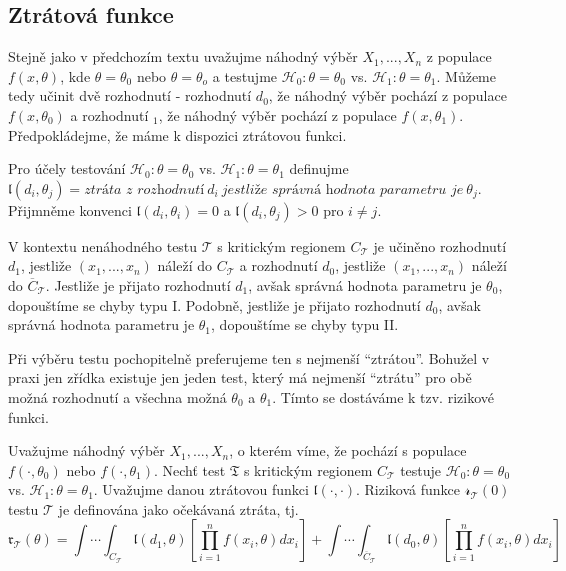 \subsection{Ztrátová funkce}

Stejně jako v předchozím textu uvažujme náhodný výběr $X_1, ..., X_n$ z populace $f(x, \theta)$, kde $\theta = \theta_0$ nebo $\theta = \theta_o$ a testujme $\mathscr{H}_0: \theta = \theta_0$ vs. $\mathscr{H}_1: \theta = \theta_1$. Můžeme tedy učinit dvě rozhodnutí - rozhodnutí $d_0$, že náhodný výběr pochází z populace $f(x, \theta_0)$ a rozhodnutí $_1$, že náhodný výběr pochází z populace $f(x, \theta_1)$. Předpokládejme, že máme k dispozici ztrátovou funkci.

\begin{definition}
Pro účely testování $\mathscr{H}_0: \theta = \theta_0$ vs. $\mathscr{H}_1: \theta = \theta_1$ definujme $\mathfrak{l}(d_i, \theta_j) = \textit{ztráta z rozhodnutí} ~ d_i ~ \textit{jestliže správná hodnota parametru je} ~ \theta_j$. Přijmněme konvenci $\mathfrak{l}(d_i, \theta_i) = 0$ a $\mathfrak{l}(d_i, \theta_j) > 0$ pro $i \neq j$.
\end{definition}

V kontextu nenáhodného testu $\mathscr{T}$ s kritickým regionem $C_{\mathscr{T}}$ je učiněno rozhodnutí $d_1$, jestliže $(x_1, ..., x_n)$ náleží do $C_{\mathscr{T}}$ a rozhodnutí $d_0$, jestliže $(x_1, ..., x_n)$ náleží do $\overline{C}_{\mathscr{T}}$. Jestliže je přijato rozhodnutí $d_1$, avšak správná hodnota parametru je $\theta_0$, dopouštíme se chyby typu I. Podobně, jestliže je přijato rozhodnutí $d_0$, avšak správná hodnota parametru je $\theta_1$, dopouštíme se chyby typu II.

Při výběru testu pochopitelně preferujeme ten s nejmenší ``ztrátou''. Bohužel v praxi jen zřídka existuje jen jeden test, který má nejmenší ``ztrátu'' pro obě možná rozhodnutí a všechna možná $\theta_0$ a $\theta_1$. Tímto se dostáváme k tzv. rizikové funkci.

\begin{definition}
Uvažujme náhodný výběr $X_1, ... ,X_n$, o kterém víme, že pochází s populace $f(\cdot, \theta_0)$ nebo $f(\cdot, \theta_1)$. Nechť test $\mathfrak{T}$ s kritickým regionem $C_{\mathscr{T}}$ testuje  $\mathscr{H}_0: \theta = \theta_0$ vs. $\mathscr{H}_1: \theta = \theta_1$. Uvažujme danou ztrátovou funkci $\mathfrak{l}(\cdot, \cdot)$. Riziková funkce $\mathscr{r}_{\mathscr{T}}(0)$ testu $\mathscr{T}$ je definována jako očekávaná ztráta, tj.
\begin{equation*}
\mathfrak{r}_{\mathscr{T}}(\theta) = \int \cdots \int_{C_{\mathscr{T}}} \mathfrak{l}(d_1, \theta)\left[\prod_{i = 1}^n f(x_i, \theta) d x_i\right] + \int \cdots \int_{\overline{C}_{\mathscr{T}}}\mathfrak{l}(d_0, \theta)\left[\prod_{i = 1}^n f(x_i, \theta) d x_i \right]
\end{equation*} 
\end{definition}


